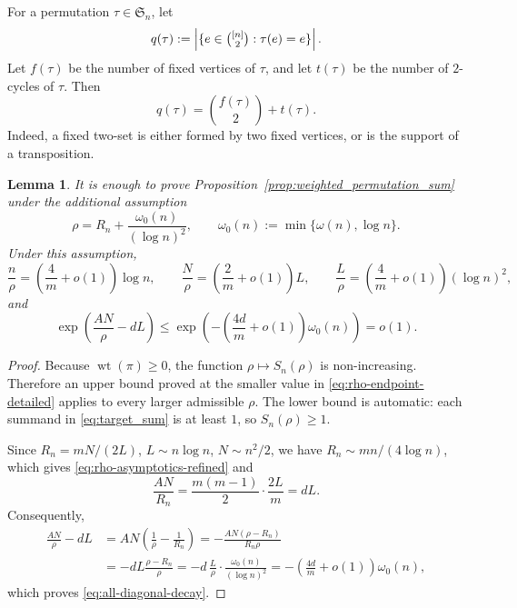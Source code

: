 \documentclass[11pt,reqno]{amsart}
\newtheorem{lemma}[theorem]{Lemma}
\theoremstyle{definition}
\theoremstyle{remark}
\renewcommand\le{\leqslant}
\renewcommand\ge{\geqslant}
\newcommand{\wt}{\operatorname{wt}}
\begin{document}
For a permutation $\tau\in\mathfrak S_n$, let
\[
        q(\tau):=\left|\{e\in\tbinom{[n]}2:\tau(e)=e\}\right| .
\]
Let $f(\tau)$ be the number of fixed vertices of $\tau$, and let $t(\tau)$ be the number of $2$-cycles of $\tau$. Then
\begin{equation}\label{eq:q-ft-detailed}
        q(\tau)=\binom{f(\tau)}2+t(\tau).
\end{equation}
Indeed, a fixed two-set is either formed by two fixed vertices, or is the support of a transposition.

\begin{lemma}\label{lem:rho-normalization-detailed}
It is enough to prove Proposition~\ref{prop:weighted_permutation_sum} under the additional assumption
\begin{equation}\label{eq:rho-endpoint-detailed}
        \rho=R_n+\frac{\omega_0(n)}{(\log n)^2},
        \qquad \omega_0(n):=\min\{\omega(n),\log n\}.
\end{equation}
Under this assumption,
\begin{equation}\label{eq:rho-asymptotics-refined}
        \frac n\rho=\left(\frac4m+o(1)\right)\log n,
        \qquad
        \frac N\rho=\left(\frac2m+o(1)\right)L,
        \qquad
        \frac L\rho=\left(\frac4m+o(1)\right)(\log n)^2,
\end{equation}
and
\begin{equation}\label{eq:all-diagonal-decay}
        \exp\left(\frac{AN}{\rho}-dL\right)
        \le \exp\left(-\left(\frac{4d}{m}+o(1)\right)\omega_0(n)\right)=o(1).
\end{equation}
\end{lemma}

\begin{proof}
Because $\wt(\pi)\ge0$, the function $\rho\mapsto S_n(\rho)$ is non-increasing. Therefore an upper bound proved at the smaller value in \eqref{eq:rho-endpoint-detailed} applies to every larger admissible $\rho$. The lower bound is automatic: each summand in \eqref{eq:target_sum} is at least $1$, so $S_n(\rho)\ge1$.

Since $R_n=mN/(2L)$, $L\sim n\log n$, $N\sim n^2/2$, we have $R_n\sim mn/(4\log n)$, which gives \eqref{eq:rho-asymptotics-refined} and
\[
\frac{AN}{R_n}=\frac{m(m-1)}2\cdot \frac{2L}{m}=dL.
\]
Consequently,
\begin{align*}
        \frac{AN}{\rho}-dL
        &=AN\left(\frac1\rho-\frac1{R_n}\right)
          =-\frac{AN(\rho-R_n)}{R_n\rho}                    \\
        &=-dL\frac{\rho-R_n}{\rho}
          =-d\,\frac{L}{\rho}\cdot \frac{\omega_0(n)}{(\log n)^2}
          =-\left(\frac{4d}{m}+o(1)\right)\omega_0(n),
\end{align*}
which proves \eqref{eq:all-diagonal-decay}.
\end{proof}
\end{document}
